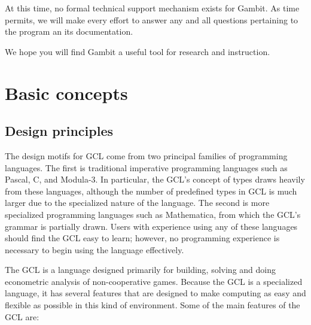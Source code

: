 At this time, no formal technical support mechanism exists for Gambit.
As time permits, we will make every effort to answer any and all
questions pertaining to the program an its documentation.

We hope you will find Gambit a useful tool for research and
instruction.

\chapter{Basic concepts}

\section{Design principles}
The design motifs for GCL come from two principal families of
programming languages.  The first is traditional imperative
programming languages such as Pascal, C, and Modula-3.  In particular,
the GCL's concept of types draws heavily from these languages,
although the number of predefined types in GCL is much larger due to
the specialized nature of the language.  The second is more
specialized programming languages such as Mathematica, from which the
GCL's grammar is partially drawn.  Users with experience using any of
these languages should find the GCL easy to learn; however, no
programming experience is necessary to begin using the language
effectively.

The GCL is a language designed primarily for building, solving and
doing econometric analysis of non-cooperative games.  Because the GCL is a
specialized language, it has several features that are designed to
make computing as easy and flexible as possible in this kind of
environment.  Some of the main features of the GCL are:

